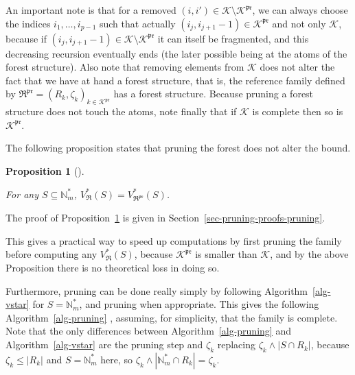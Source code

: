 \documentclass[
  11pt,
  a4paper,
]{article}
\theoremstyle{plain}
\theoremstyle{definition}
\theoremstyle{plain}
\theoremstyle{definition}
\theoremstyle{plain}
\newtheorem{proposition}{Proposition}[section]
\theoremstyle{remark}
\begin{document}
An important note is that for a removed
\((i,i')\in\mathcal{K}\setminus\mathcal{K}^{\mathfrak{pr}}\), we can
always choose the indices \(i_1,\dotsc,i_{p-1}\) such that actually
\((i_j,i_{j+1}-1)\in\mathcal{K}^{\mathfrak{pr}}\) and not only
\(\mathcal{K}\), because if
\((i_j,i_{j+1}-1)\in\mathcal{K}\setminus\mathcal{K}^{\mathfrak{pr}}\) it
can itself be fragmented, and this decreasing recursion eventually ends
(the later possible being at the atoms of the forest structure). Also
note that removing elements from \(\mathcal{K}\) does not alter the fact
that we have at hand a forest structure, that is, the reference family
defined by
\(\mathfrak{R}^{\mathfrak{pr}}=(R_k,\zeta_k)_{k\in\mathcal{K}^{\mathfrak{pr}}}\)
has a forest structure. Because pruning a forest structure does not
touch the atoms, note finally that if \(\mathcal{K}\) is complete then
so is \(\mathcal{K}^{\mathfrak{pr}}\).

The following proposition states that pruning the forest does not alter
the bound.

\begin{proposition}[]\protect\hypertarget{prp-pruning}{}\label{prp-pruning}

For any \(S\subseteq \mathbb{N}_m^*\),
\(V^*_{\mathfrak{R}}(S)=V^*_{\mathfrak{R}^{\mathfrak{pr}}}(S)\).

\end{proposition}

The proof of Proposition~\ref{prp-pruning} is given in
Section~\ref{sec-pruning-proofs-pruning}.

This gives a practical way to speed up computations by first pruning the
family before computing any \(V^*_{\mathfrak{R}}(S)\), because
\(\mathcal{K}^{\mathfrak{pr}}\) is smaller than \(\mathcal{K}\), and by
the above Proposition there is no theoretical loss in doing so.

Furthermore, pruning can be done really simply by following
 Algorithm~\ref{alg-vstar}  for \(S=\mathbb{N}_m^*\), and pruning when
appropriate. This gives the following  Algorithm~\ref{alg-pruning} ,
assuming, for simplicity, that the family is complete. Note that the
only differences between  Algorithm~\ref{alg-pruning}  and
 Algorithm~\ref{alg-vstar}  are the pruning step and \(\zeta_k\)
replacing \(\zeta_k\wedge|S\cap R_k|\), because \(\zeta_k\leq|R_k|\) and
\(S=\mathbb{N}_m^*\) here, so
\(\zeta_k\wedge|\mathbb{N}_m^*\cap R_k|=\zeta_k\).
\end{document}
